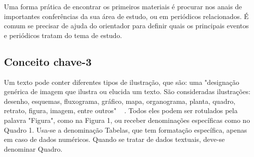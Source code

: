 Uma forma prática de encontrar os primeiros materiais é procurar nos anais de importantes conferências da sua área de estudo, ou em periódicos relacionados. É comum se precisar de ajuda do orientador para definir quais os principais eventos e periódicos tratam do tema de estudo.

\subsection{Conceito chave-3}

Um texto pode conter diferentes tipos de ilustração, que são: uma "designação genérica de imagem que ilustra ou elucida um texto. São consideradas ilustrações: desenho, esquemas, fluxograma, gráfico, mapa, organograma, planta, quadro, retrato, figura, imagem, entre outros" ~ \cite{ufc_guia}. Todos eles podem ser rotulados pela palavra "Figura", como na Figura 1, ou receber denominações específicas como no Quadro 1. 
Usa-se a denominação Tabelas, que tem formatação específica, apenas em caso de dados numéricos. Quando se tratar de dados textuais, deve-se denominar Quadro.

\begin{figure}[htbp]
	\centering	
\end{figure}

\begin{table}[!ht]
\end{table}


